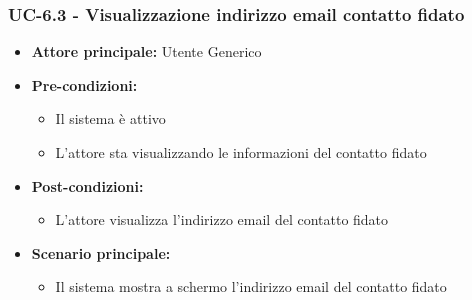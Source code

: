 \documentclass[a4paper,12pt]{article}
\begin{document}
\subsubsection{UC-6.3 - Visualizzazione indirizzo email contatto fidato} \label{subsec:UC-6.3}
\begin{itemize}
    \item \textbf{Attore principale:} Utente Generico
    \item \textbf{Pre-condizioni:} 
    \begin{itemize}
        \item Il sistema è attivo
        \item L'attore sta visualizzando le informazioni del contatto fidato
    \end{itemize}
    \item \textbf{Post-condizioni:}
    \begin{itemize}
        \item L'attore visualizza l'indirizzo email del contatto fidato
    \end{itemize}
    \item \textbf{Scenario principale:} 
    \begin{itemize}
        \item Il sistema mostra a schermo l'indirizzo email del contatto fidato
    \end{itemize}
\end{itemize}

\end{document}
